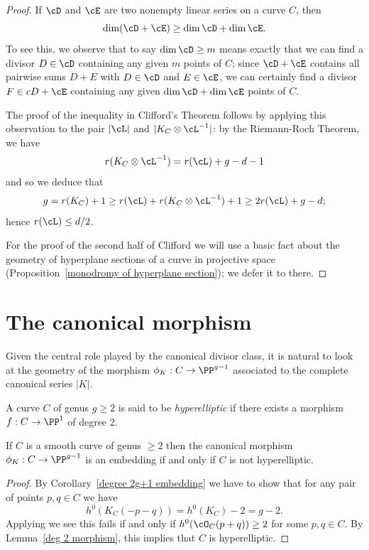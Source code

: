\begin{proof}
If $\cD$ and $\cE$ are two nonempty linear series on a curve $C$, then
$$
\dim(\cD + \cE) \geq \dim \cD + \dim \cE.
$$
To see this, we observe that to say $\dim \cD \geq m$ means exactly that we can find a divisor $D \in \cD$ containing any given $m$ points of $C$; since $\cD + \cE$ contains all pairwise sums $D + E$ with $D \in \cD$ and $E \in \cE$, we can certainly find a divisor $F \in cD + \cE$ containing any given $\dim \cD + \dim \cE$ points of $C$.

The proof of the inequality in Clifford's Theorem follows  by applying this observation to the pair $|\cL|$ and $|K_C\otimes \cL^{-1}|$: by 
the Riemann-Roch Theorem, we have
$$
r(K_C\otimes \cL^{-1}) = r(\cL) +g - d - 1
$$
and so we deduce that
$$
g = r(K_C) + 1 \geq r(\cL) + r(K_C\otimes \cL^{-1}) + 1 \geq 2r(\cL) +g - d;
$$
hence $r(\cL) \leq d/2$.

For the proof of the second half of Clifford we will use a basic fact about the geometry of hyperplane sections of a curve in projective space (Proposition~\ref{monodromy of hyperplane section}); we defer it to there.
\end{proof}



\section{The canonical morphism}

Given the central role played by the canonical divisor class, it is natural to look at the geometry of the morphism $\phi_K : C \to \PP^{g-1}$ associated to the complete canonical series $|K|$.  

\begin{definition}
A curve $C$ of genus $g \geq 2$ is said to be \emph{hyperelliptic} if there exists a morphism $f: C \to \PP^1$ of degree 2. \end{definition}

\begin{theorem}\label{canonical system is very ample}
If $C$ is a smooth curve of genus $\geq 2$ then the canonical morphism $\phi_K : C \to \PP^{g-1}$ is an embedding if and only if $C$ is not hyperelliptic.
\end{theorem}

\begin{proof}
By Corollary~\ref{degree 2g+1 embedding} we have to show that for any pair of points $p, q \in C$ we have
$$
h^0(K_C(-p-q)) = h^0(K_C)-2 = g-2.
$$
Applying \trr we see this fails if and only if $h^0(\cO_C(p+q)) \geq 2$ for some $p,q \in C$. By Lemma~\ref{deg 2 morphism}, this implies that $C$ is hyperelliptic.
\end{proof}

